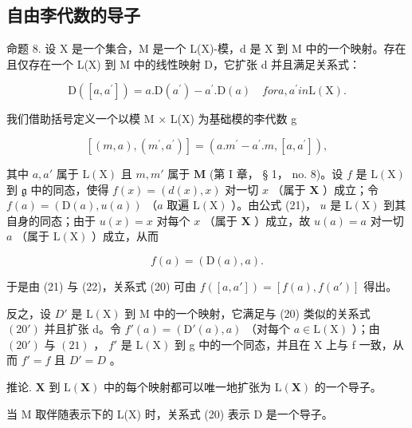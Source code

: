 \subsection{自由李代数的导子}

命题 8. 设 X 是一个集合，M 是一个 L(X)-模，d 是 X 到 M 中的一个映射。存在且仅存在一个 L(X) 到 M 中的线性映射 D，它扩张 d 并且满足关系式：

\[
\mathrm{D} ([ a, a ^ {\prime} ]) = a. \mathrm{D} (a ^ {\prime}) - a ^ {\prime}. \mathrm{D} (a) \quad for a, a ^ {\prime} in \mathrm{L} (\mathrm{X}).\tag{20}
\]

我们借助括号定义一个以模 M × L(X) 为基础模的李代数 g

\[
[ (m, a), (m ^ {\prime}, a ^ {\prime}) ] = (a. m ^ {\prime} - a ^ {\prime}. m, [ a, a ^ {\prime} ]),\tag{21}
\]

其中 \(a, a'\) 属于 \(\mathrm{L}(\mathrm{X})\) 且 \(m, m'\) 属于 \(\mathbf{M}\) (第 I 章， § 1， no. 8)。设 \(f\) 是 \(\mathrm{L}(\mathrm{X})\) 到 \(\mathfrak{g}\) 中的同态，使得 \(f(x) = (d(x), x)\) 对一切 \(x\) （属于 \(\mathbf{X}\) ）成立；令 \(f(a) = (\mathrm{D}(a), u(a))\) （\(a\) 取遍 \(\mathrm{L}(\mathrm{X})\) ）。由公式 (21)， \(u\) 是 \(\mathrm{L}(\mathrm{X})\) 到其自身的同态；由于 \(u(x) = x\) 对每个 \(x\) （属于 \(\mathbf{X}\) ）成立，故 \(u(a) = a\) 对一切 \(a\) （属于 \(\mathrm{L}(\mathrm{X})\) ）成立，从而

\[
f (a) = (\mathrm{D} (a), a).\tag{22}
\]

于是由 (21) 与 (22)，关系式 (20) 可由 \(f([a, a']) = [f(a), f(a')]\) 得出。

反之，设 \(D'\) 是 \(\mathrm{L}(\mathrm{X})\) 到 M 中的一个映射，它满足与 (20) 类似的关系式 \((20')\) 并且扩张 d。令 \(f'(a) = (\mathrm{D}'(a), a)\) （对每个 \(a \in \mathrm{L}(\mathrm{X})\) ）；由 \((20')\) 与 \((21)\) ， \(f'\) 是 \(\mathrm{L}(\mathrm{X})\) 到 g 中的一个同态，并且在 X 上与 f 一致，从而 \(f' = f\) 且 \(D' = D\) 。

推论. \(\mathbf{X}\) 到 \(\mathrm{L}(\mathbf{X})\) 中的每个映射都可以唯一地扩张为 \(\mathrm{L}(\mathbf{X})\) 的一个导子。

当 M 取伴随表示下的 L(X) 时，关系式 (20) 表示 D 是一个导子。

